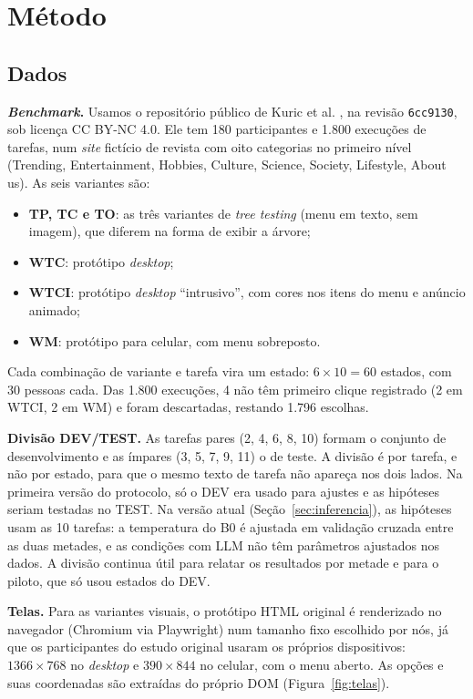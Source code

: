 \documentclass[12pt]{article}
\newcommand{\code}[1]{\texttt{#1}}
\begin{document}
\section{Método}
\label{sec:metodo}

\subsection{Dados}
\label{sec:dados}

\textbf{\textit{Benchmark}.} Usamos o repositório público de Kuric et al. \cite{kuric2025dataset}, na revisão \code{6cc9130}, sob licença CC BY-NC 4.0. Ele tem 180 participantes e 1.800 execuções de tarefas, num \textit{site} fictício de revista com oito categorias no primeiro nível (Trending, Entertainment, Hobbies, Culture, Science, Society, Lifestyle, About us). As seis variantes são:
\begin{itemize}[leftmargin=*,itemsep=0pt]
\item \textbf{TP, TC e TO}: as três variantes de \textit{tree testing} (menu em texto, sem imagem), que diferem na forma de exibir a árvore;
\item \textbf{WTC}: protótipo \textit{desktop};
\item \textbf{WTCI}: protótipo \textit{desktop} ``intrusivo'', com cores nos itens do menu e anúncio animado;
\item \textbf{WM}: protótipo para celular, com menu sobreposto.
\end{itemize}

Cada combinação de variante e tarefa vira um estado: $6\times10=60$ estados, com 30 pessoas cada. Das 1.800 execuções, 4 não têm primeiro clique registrado (2 em WTCI, 2 em WM) e foram descartadas, restando 1.796 escolhas.

\textbf{Divisão DEV/TEST.} As tarefas pares (2, 4, 6, 8, 10) formam o conjunto de desenvolvimento e as ímpares (3, 5, 7, 9, 11) o de teste. A divisão é por tarefa, e não por estado, para que o mesmo texto de tarefa não apareça nos dois lados. Na primeira versão do protocolo, só o DEV era usado para ajustes e as hipóteses seriam testadas no TEST. Na versão atual (Seção~\ref{sec:inferencia}), as hipóteses usam as 10 tarefas: a temperatura do B0 é ajustada em validação cruzada entre as duas metades, e as condições com LLM não têm parâmetros ajustados nos dados. A divisão continua útil para relatar os resultados por metade e para o piloto, que só usou estados do DEV.

\textbf{Telas.} Para as variantes visuais, o protótipo HTML original é renderizado no navegador (Chromium via Playwright) num tamanho fixo escolhido por nós, já que os participantes do estudo original usaram os próprios dispositivos: $1366\times768$ no \textit{desktop} e $390\times844$ no celular, com o menu aberto. As opções e suas coordenadas são extraídas do próprio DOM (Figura~\ref{fig:telas}).
\end{document}
